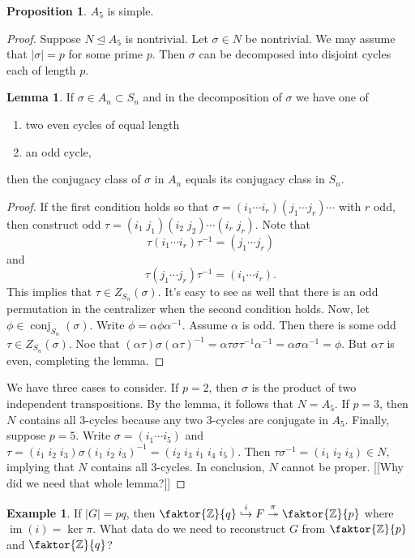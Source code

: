 \documentclass[10pt,letterpaper,cm]{nupset}
\theoremstyle{definition}
\newtheorem{exmp}[definition]{Example}
\theoremstyle{theorem}
\newtheorem{lemma}[definition]{Lemma}
\newtheorem{prop}[definition]{Proposition}
\theoremstyle{remark}
\newcommand{\Z}{\mathbb Z}
\newcommand{\1}{\mathbf{1}}
\newcommand{\0}{\vec 0}
\DeclareMathOperator{\conj}{conj}
\DeclareMathOperator{\im}{im}
\begin{document}
\begin{prop}
$A_5$ is simple.
\end{prop}
\begin{proof}
Suppose $N \unlhd A_5$ is nontrivial. Let $\sigma \in N$ be nontrivial. We may assume that $|\sigma| =p$ for some prime $p$. Then $\sigma$ can be decomposed into disjoint cycles each of length $p$.
\begin{lemma}
If $\sigma \in A_n \subset S_n$ and in the decomposition of $\sigma$ we have one of
\begin{enumerate}
\item two even cycles of equal length
\item an odd cycle,
\end{enumerate}
then the conjugacy class of $\sigma$ in $A_n$ equals its conjugacy class in $S_n$.
\end{lemma}
\begin{proof}
If the first condition holds so that $\sigma = (i_1 \cdots i_r)(j_1 \cdots j_r)\cdots$ with $r$ odd, then construct odd $\tau = (i_1 \; j_1)(i_2 \; j_2) \cdots (i_r \; j_r)$. Note that $$\tau(i_1 \cdots i_r)\tau^{-1} = (j_1 \cdots j_r) $$ and $$\tau (j_1 \cdots j_r) \tau^{-1} = (i_1 \cdots i_r).$$ This implies that $\tau \in Z_{S_n}(\sigma)$. It's easy to see as well that there is an odd permutation in the centralizer when the second condition holds. Now, let $\phi \in \conj_{S_n}(\sigma)$. Write $\phi = \alpha \phi \alpha^{-1}$. Assume $\alpha$ is odd. Then there is some odd $\tau \in Z_{S_n}(\sigma)$. Noe that $(\alpha \tau) \sigma (\alpha \tau)^{-1} = \alpha \tau \sigma \tau^{-1} \alpha^{-1} = \alpha \sigma \alpha^{-1} = \phi$. But $\alpha \tau$ is even, completing the lemma.
\end{proof}
We have three cases to consider. If $p=2$, then $\sigma$ is the product of two independent transpositions. By the lemma, it follows that $N = A_5$. If $p=3$, then $N$ contains all $3$-cycles because any two $3$-cycles are conjugate in $A_5$. Finally, suppose $p=5$. Write $\sigma = (i_1 \cdots i_5)$ and $\tau = (i_1 \; i_2\; i_3) \sigma (i_1 \; i_2\; i_3)^{-1} = (i_2 \; i_3 \; i_1 \; i_4 \; i_5)$. Then $\tau \sigma^{-1} = (i_1 \; i_2 \; i_3) \in N$, implying that $N$ contains all $3$-cycles. In conclusion, $N$ cannot be proper. {[[Why did we need that whole lemma?]]}
\end{proof}

\begin{exmp}
If $|G| = pq$, then $\faktor{\Z}{q} \overset{i}{\hookrightarrow} F \overset{\pi}{\twoheadrightarrow} \faktor{\Z}{p}$ where $\im(i) = \ker \pi$. What data do we need to reconstruct $G$ from $\faktor{\Z}{p}$ and $\faktor{\Z}{q}$?
\end{exmp}
\end{document}
